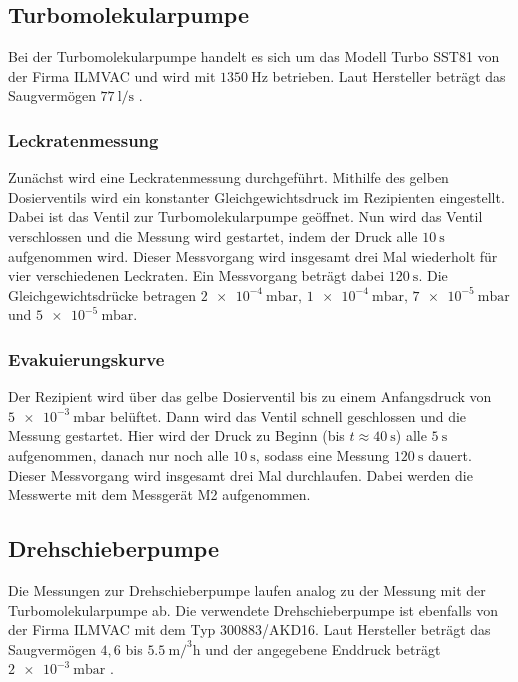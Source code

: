         \subsection{Turbomolekularpumpe}
            Bei der Turbomolekularpumpe handelt es sich um das Modell Turbo SST81 von der Firma ILMVAC und wird mit $\SI{1350}{\hertz}$ betrieben.
            Laut Hersteller beträgt das Saugvermögen $\SI{77}{\litre\per\second}$ \cite{anleitung}.

            \subsubsection{Leckratenmessung}
                Zunächst wird eine Leckratenmessung durchgeführt.
                Mithilfe des gelben Dosierventils wird ein konstanter Gleichgewichtsdruck im Rezipienten eingestellt.
                Dabei ist das Ventil zur Turbomolekularpumpe geöffnet.
                Nun wird das Ventil verschlossen und die Messung wird gestartet, indem der Druck alle $\SI{10}{\second}$ aufgenommen wird.
                Dieser Messvorgang wird insgesamt drei Mal wiederholt für vier verschiedenen Leckraten.
                Ein Messvorgang beträgt dabei $\SI{120}{\second}$.
                Die Gleichgewichtsdrücke betragen $\SI{2e-4}{\milli\bar}, \, \SI{1e-4}{\milli\bar}, \, \SI{7e-5}{\milli\bar}$ und $\SI{5e-5}{\milli\bar}$.

            \subsubsection{Evakuierungskurve}
                Der Rezipient wird über das gelbe Dosierventil bis zu einem Anfangsdruck von $\SI{5e-3}{\milli\bar}$ belüftet.
                Dann wird das Ventil schnell geschlossen und die Messung gestartet.
                Hier wird der Druck zu Beginn (bis $t \approx \SI{40}{\second}$) alle $\SI{5}{\second}$ aufgenommen, danach nur noch alle $\SI{10}{\second}$, sodass eine Messung $\SI{120}{\second}$ dauert.
                Dieser Messvorgang wird insgesamt drei Mal durchlaufen.
                Dabei werden die Messwerte mit dem Messgerät M2 aufgenommen.

        \subsection{Drehschieberpumpe}
            Die Messungen zur Drehschieberpumpe laufen analog zu der Messung mit der Turbomolekularpumpe ab.
            Die verwendete Drehschieberpumpe ist ebenfalls von der Firma ILMVAC mit dem Typ 300883/AKD16.
            Laut Hersteller beträgt das Saugvermögen $4,6$ bis $\SI{5.5}{\metre\cubic\per\hour}$ und der angegebene Enddruck beträgt $\SI{2e-3}{\milli\bar}$ \cite{anleitung}.

